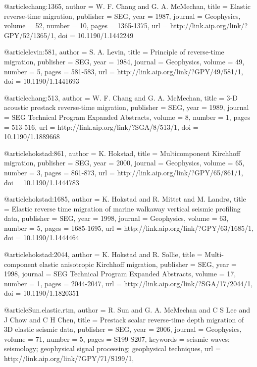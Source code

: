 {@article{chang:1365,
  author =	 {W. F. Chang and G. A. McMechan},
  title =	 {Elastic reverse-time migration},
  publisher =	 {SEG},
  year =	 1987,
  journal =	 {Geophysics},
  volume =	 52,
  number =	 10,
  pages =	 {1365-1375},
  url =		 {http://link.aip.org/link/?GPY/52/1365/1},
  doi =		 {10.1190/1.1442249}
}

@article{levin:581,
  author =	 {S. A. Levin},
  title =	 {Principle of reverse-time migration},
  publisher =	 {SEG},
  year =	 1984,
  journal =	 {Geophysics},
  volume =	 49,
  number =	 5,
  pages =	 {581-583},
  url =		 {http://link.aip.org/link/?GPY/49/581/1},
  doi =		 {10.1190/1.1441693}
}

@article{chang:513,
  author =	 {W. F. Chang and G. A. McMechan},
  title =	 {3-{D} acoustic prestack reverse-time migration},
  publisher =	 {SEG},
  year =	 1989,
  journal =	 {SEG Technical Program Expanded Abstracts},
  volume =	 8,
  number =	 1,
  pages =	 {513-516},
  url =		 {http://link.aip.org/link/?SGA/8/513/1},
  doi =		 {10.1190/1.1889668}
}

@article{hokstad:861,
  author =	 {K. Hokstad},
  title =	 {Multicomponent {K}irchhoff migration},
  publisher =	 {SEG},
  year =	 2000,
  journal =	 {Geophysics},
  volume =	 65,
  number =	 3,
  pages =	 {861-873},
  url =		 {http://link.aip.org/link/?GPY/65/861/1},
  doi =		 {10.1190/1.1444783}
}

@article{hokstad:1685,
  author =	 {K. Hokstad and R. Mittet and M. Landr\o},
  title =	 {Elastic reverse time migration of marine walkaway
                  vertical seismic profiling data},
  publisher =	 {SEG},
  year =	 1998,
  journal =	 {Geophysics},
  volume =	 63,
  number =	 5,
  pages =	 {1685-1695},
  url =		 {http://link.aip.org/link/?GPY/63/1685/1},
  doi =		 {10.1190/1.1444464}
}

@article{hokstad:2044,
  author =	 {K. Hokstad and R. Sollie},
  title =	 {Multi-component elastic anisotropic {K}irchhoff
                  migration},
  publisher =	 {SEG},
  year =	 1998,
  journal =	 {SEG Technical Program Expanded Abstracts},
  volume =	 17,
  number =	 1,
  pages =	 {2044-2047},
  url =		 {http://link.aip.org/link/?SGA/17/2044/1},
  doi =		 {10.1190/1.1820351}
}

@article{Sun.elastic.rtm,
  author =	 {R. Sun and G. A. McMechan and C S Lee
                  and J Chow and C H Chen},
  title =	 {Prestack scalar reverse-time depth migration of 3{D}
                  elastic seismic data},
  publisher =	 {SEG},
  year =	 2006,
  journal =	 {Geophysics},
  volume =	 71,
  number =	 5,
  pages =	 {S199-S207},
  keywords =	 {seismic waves; seismology; geophysical signal
                  processing; geophysical techniques},
  url =		 {http://link.aip.org/link/?GPY/71/S199/1},
}

}
